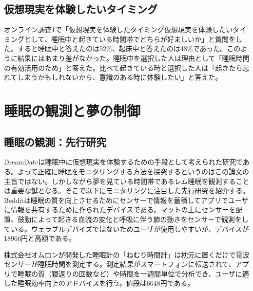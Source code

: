 
\subsection{仮想現実を体験したいタイミング }
オンライン調査1で「仮想現実を体験したタイミング仮想現実を体験したいタイミングとして、睡眠中と起きている時間帯でどちらが好ましいか」と質問をした。すると睡眠中と答えたのは52\%、起床中と答えたのは48\%であった。このように結果にはあまり差がなかった。睡眠中を選択した人は理由として「睡眠時間の有効活用のため」と答えた。比べて起きている時と選択した人は「起きたら忘れてしまうかもしれないから、意識のある時に体験したい」と答えた。

\section{睡眠の観測と夢の制御}
\subsection{睡眠の観測：先行研究}
DreamDateは睡眠中に仮想現実を体験するための手段として考えられた研究である。よって正確に睡眠をモニタリングする方法を探究するというのはこの論文の主旨ではない。しかしながら夢を見ている時間帯であるレム睡眠を観測することは重要な鍵となる。そこで以下にモニタリングに注目した先行研究を紹介する。\\
Bedditは睡眠の質を向上させるためにセンサーで情報を蓄積してアプリでユーザに情報を共有するために作られたデバイスである\cite{beddit}。マットの上にセンサーを配置、鼓動によって起きる血流の変化と呼吸に伴う肺の動きをセンサーで観測をしている。ウェラブルデバイズではないためユーザが使用しやすいが、デバイスが18966円と高額である。

株式会社オムロンが開発した睡眠計の「ねむり時間計」は枕元に置くだけで電波センサーが睡眠時間を測定する\cite{omron}。測定結果がスマートフォンに転送されて、アプリで睡眠の質（寝返りの回数など）や時間を一週間単位で分析でき、ユーザに適した睡眠効率向上のアドバイスを行う。値段は6648円である。

